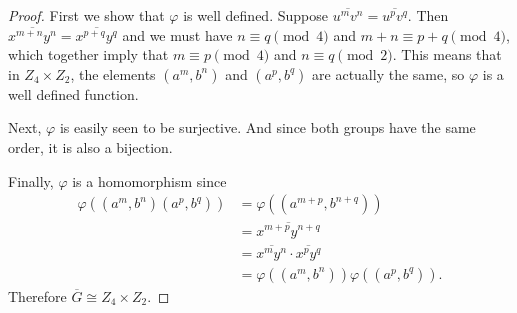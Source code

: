 \begin{enumerate}
\begin{proof}
    First we show that $\varphi$ is well defined. Suppose
    $\overline{u^mv^n} = \overline{u^pv^q}$. Then
    $\overline{x^{m+n}y^n} = \overline{x^{p+q}y^q}$ and we must have
    $n\equiv q\pmod4$ and $m+n\equiv p+q\pmod4$, which together imply
    that $m\equiv p\pmod4$ and $n\equiv q\pmod2$. This means that in
    $Z_4\times Z_2$, the elements $(a^m,b^n)$ and $(a^p,b^q)$ are
    actually the same, so $\varphi$ is a well defined function.

    Next, $\varphi$ is easily seen to be surjective. And since both
    groups have the same order, it is also a bijection.

    Finally, $\varphi$ is a homomorphism since
    \begin{align*}
      \varphi((a^m,b^n)(a^p,b^q))
      &= \varphi((a^{m+p},b^{n+q})) \\
      &= \overline{x^{m+p}y^{n+q}} \\
      &= \overline{x^my^n}\cdot\overline{x^py^q} \\
      &= \varphi((a^m,b^n))\varphi((a^p,b^q)).
    \end{align*}
    Therefore $\overline{G}\cong Z_4\times Z_2$.
  \end{proof}
\end{enumerate}

